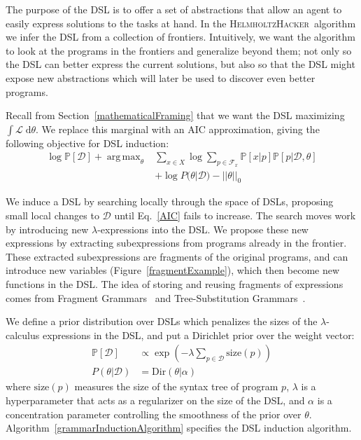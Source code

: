 \documentclass{article}
\newcommand{\system}{\textsc{HelmholtzHacker}~}
\newcommand{\lowerBound}{\mathscr{L}}
\DeclareMathOperator*{\argmax}{arg\,max} %
\newcommand{\probability}{\mathds{P}} %
\begin{document}
The purpose of the DSL is to
offer a set of abstractions
that allow an agent to easily express solutions to the tasks at hand.
In the \system algorithm we infer the DSL from a collection of frontiers.
Intuitively, we want the algorithm to
look at the programs in the frontiers and
generalize beyond them; 
not only so the DSL can better express the current solutions,
but also so that the DSL might expose new abstractions
which will later be used to
discover even better programs.

Recall from Section~\ref{mathematicalFraming} that we want the DSL maximizing $\int \lowerBound\;\mathrm{d}\theta$.
We replace this marginal with an AIC approximation, giving the following objective for DSL induction:
\begin{align}
\nonumber  \log \probability[\mathcal{D}] + \argmax_{\theta}& \sum_{x\in X}\log \sum_{p\in \mathcal{F}_x}\probability[x|p]\probability[p|\mathcal{D},\theta]\\
&+  \log P(\theta|\mathcal{D}) - ||\theta||_0 \label{AIC}
  \end{align}

We induce a DSL by searching locally through the space of DSLs,
proposing small local changes to $\mathcal{D}$ until Eq.~\ref{AIC} fails to increase.
The search moves work by introducing new
$\lambda$-expressions into the DSL.
We propose these new expressions by extracting subexpressions from
programs already in the frontier.
These extracted subexpressions
are fragments of the original programs, and can introduce new variables (Figure~\ref{fragmentExample}),
which then become new functions in the DSL.
The idea of storing and reusing
fragments of expressions comes from Fragment Grammars~\cite{tim} and Tree-Substitution Grammars~\cite{cohn2010inducing}.



We define a prior distribution over DSLs which penalizes the sizes of the $\lambda$-calculus expressions in the DSL, and put a Dirichlet prior over the weight vector:
\begin{align*}
  \probability[\mathcal{D}]&\propto\exp\left(-\lambda\sum_{p\in \mathcal{D}}\text{size}(p) \right)\\
  P(\theta|\mathcal{D})& = \text{Dir}(\theta|\alpha)
\end{align*}
where $\text{size}(p)$  measures the size of the syntax tree of program $p$,
$\lambda$ is a hyperparameter that acts as a regularizer on the size of the DSL,
and $\alpha$ is a concentration parameter controlling the smoothness of the prior over $\theta$.
Algorithm~\ref{grammarInductionAlgorithm} specifies the DSL induction algorithm.
\end{document}
